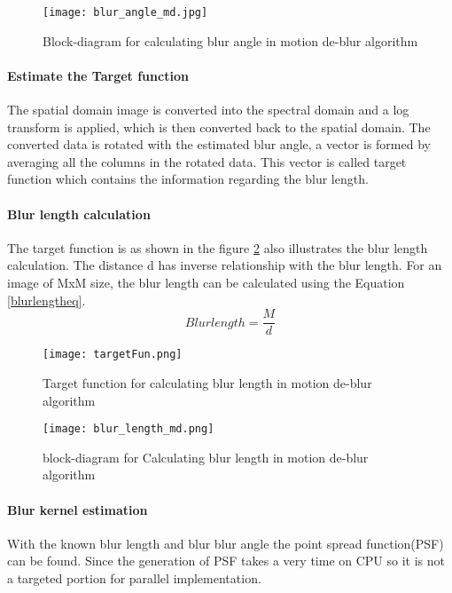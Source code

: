 \begin{figure}[h!]
	\centering
	\texttt{[image: blur\_angle\_md.jpg]}
	\caption{Block-diagram for calculating blur angle in motion de-blur algorithm}
	\label{blur angle}
\end{figure}
	\paragraph*{Estimate the Target function} \hfill \break
	The spatial domain image is converted into the spectral domain and a log transform is applied, which is then converted back to the spatial domain. The converted data is rotated with the estimated blur angle, a vector is formed by averaging all the columns in the rotated data. This vector is called target function which contains the information regarding the blur length.
	\paragraph*{Blur length calculation} \hfill \break
	The target function is as shown in the figure \ref{target function} also illustrates the blur length calculation. The distance d has inverse relationship with the blur length. For an image of MxM size, the blur length can be calculated using the Equation \ref{blurlengtheq}.
	\begin{equation}\label{blurlengtheq}
		Blur length = \frac{M}{d}
	\end{equation}
	\begin{figure}[h!]
		\centering
		\texttt{[image: targetFun.png]}
		\caption{Target function for calculating blur length in motion de-blur algorithm}
		\label{target function}
	\end{figure}
	\begin{figure}[h!]
		\centering
		\texttt{[image: blur\_length\_md.png]}
		\caption{block-diagram for Calculating blur length in motion de-blur algorithm}
		\label{blur length}
	\end{figure}
	\paragraph*{Blur kernel estimation} \hfill \break
	With the known blur length and blur blur angle the point spread function(PSF) can be found. Since the generation of PSF takes a very time on CPU so it is not a targeted portion for parallel implementation.
